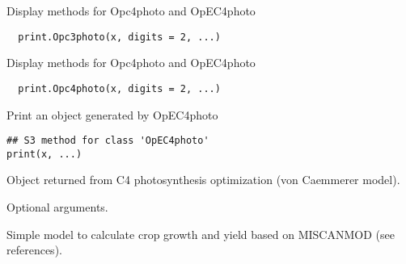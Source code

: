 \documentclass[letterpaper]{book}
\begin{document}
%
\begin{Description}\relax
Display methods for Opc4photo and OpEC4photo
\end{Description}
%
\begin{Usage}
\begin{verbatim}
  print.Opc3photo(x, digits = 2, ...)
\end{verbatim}
\end{Usage}
%
\begin{Description}\relax
Display methods for Opc4photo and OpEC4photo
\end{Description}
%
\begin{Usage}
\begin{verbatim}
  print.Opc4photo(x, digits = 2, ...)
\end{verbatim}
\end{Usage}
%
\begin{Description}\relax
Print an object generated by OpEC4photo
\end{Description}
%
\begin{Usage}
\begin{verbatim}
## S3 method for class 'OpEC4photo'
print(x, ...)
\end{verbatim}
\end{Usage}
%
\begin{Arguments}
\begin{ldescription}
\item[\code{x}] 
Object returned from C4 photosynthesis optimization
(von Caemmerer model).

\item[\code{...}] 
Optional arguments. 

\end{ldescription}
\end{Arguments}
%
\begin{SeeAlso}\relax
\end{SeeAlso}
%
\begin{Description}\relax
Simple model to calculate crop growth and yield based on
MISCANMOD (see references).
\end{Description}
\end{document}
